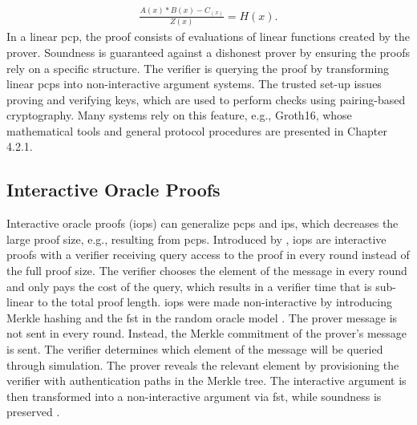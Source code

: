 \begin{align}
    \frac{A(x) * B(x) - C_(x)}{Z(x)} = H(x).
\end{align}
In a linear \acrshort{pcp}, the proof consists of evaluations of linear functions created by the prover. Soundness is guaranteed against a dishonest prover by ensuring the proofs rely on a specific structure. The verifier is querying the proof by transforming linear \acrshort{pcp}s into non-interactive argument systems. The trusted set-up issues proving and verifying keys, which are used to perform checks using pairing-based cryptography. Many systems rely on this feature, e.g., Groth16, whose mathematical tools and general protocol procedures are presented in Chapter 4.2.1.

\subsection{Interactive Oracle Proofs}
Interactive oracle proofs (\acrshort{iop}s) can generalize \acrshort{pcp}s and \acrshort{ip}s, which decreases the large proof size, e.g., resulting from \acrshort{pcp}s. Introduced by \citet{IOPsdisc}, \acrshort{iop}s are interactive proofs with a verifier receiving query access to the proof in every round instead of the full proof size. The verifier chooses the element of the message in every round and only pays the cost of the query, which results in a verifier time that is sub-linear to the total proof length. \acrshort{iop}s were made non-interactive by introducing Merkle hashing and the \acrshort{fst} in the random oracle model \citep{IOPsdisc}. The prover message is not sent in every round. Instead, the Merkle commitment of the prover's message is sent. The verifier determines which element of the message will be queried through simulation. The prover reveals the relevant element by provisioning the verifier with authentication paths in the Merkle tree. The interactive argument is then transformed into a non-interactive argument via \acrshort{fst}, while soundness is preserved \citep{Thaler}.

